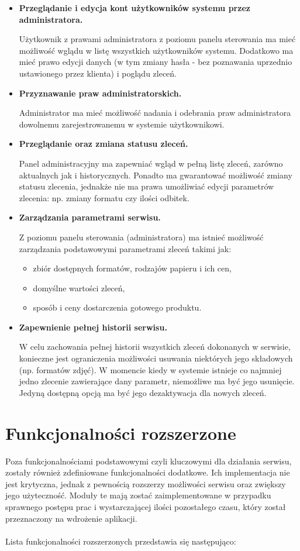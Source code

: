 \begin{itemize}
    \item \textbf{Przeglądanie i edycja kont użytkowników systemu przez administratora.}
    
    Użytkownik z prawami administratora z poziomu panelu sterowania ma mieć możliwość wglądu w listę wszystkich użytkowników systemu. Dodatkowo ma mieć prawo edycji danych (w tym zmiany hasła - bez poznawania uprzednio ustawionego przez klienta) i poglądu zleceń.
    \item \textbf{Przyznawanie praw administratorskich.}
    
    Administrator ma mieć możliwość nadania i odebrania praw administratora dowolnemu zarejestrowanemu w systemie użytkownikowi.
    
    \item \textbf{Przeglądanie oraz zmiana statusu zleceń.}
    
    Panel administracyjny ma zapewniać wgląd w pełną listę zleceń, zarówno aktualnych jak i historycznych. Ponadto ma gwarantować możliwość zmiany statusu zlecenia, jednakże nie ma prawa umożliwiać edycji parametrów zlecenia: np. zmiany formatu czy ilości odbitek.
    
    \item \textbf{Zarządzania parametrami serwisu.}
    
    Z poziomu panelu sterowania (administratora) ma istnieć możliwość zarządzania podstawowymi parametrami zleceń takimi jak:
    \begin{itemize}
        \item zbiór dostępnych formatów, rodzajów papieru i ich cen,
        \item domyślne wartości zleceń,
        \item sposób i ceny dostarczenia gotowego produktu.
    \end{itemize}
    
    \item \textbf{Zapewnienie pełnej historii serwisu.}
    
    W celu zachowania pełnej historii wszystkich zleceń dokonanych w serwisie, konieczne jest ograniczenia możliwości usuwania niektórych jego składowych (np. formatów zdjęć). W momencie kiedy w systemie istnieje co najmniej jedno zlecenie zawierające dany parametr, niemożliwe ma być jego usunięcie. Jedyną dostępną opcją ma być jego dezaktywacja dla nowych zleceń.
\end{itemize}


\section{Funkcjonalności rozszerzone}
\quad Poza funkcjonalnościami podstawowymi czyli kluczowymi dla działania serwisu, zostały również zdefiniowane funkcjonalności dodatkowe. Ich implementacja nie jest krytyczna, jednak z pewnością rozszerzy możliwości serwisu oraz zwiększy jego użyteczność. Moduły te mają zostać zaimplementowane w przypadku sprawnego postępu prac i wystarczającej ilości pozostałego czasu, który został przeznaczony na wdrożenie aplikacji.\\
\\
Lista funkcjonalności rozszerzonych przedstawia się następująco:


